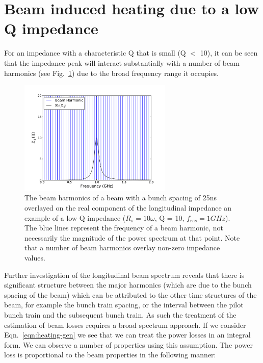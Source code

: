\documentclass{cernrep}
\begin{document}
\section{Beam induced heating due to a low Q impedance}

For an impedance with a characteristic Q that is small (Q $<$ 10), it can be seen that the impedance peak will interact substantially with a number of beam harmonics (see Fig.~\ref{fig:low_q_harmonics}) due to the broad frequency range it occupies.

\begin{figure}
\begin{center}
\includegraphics[width=0.65\textwidth]{figures/low_q_10_resonance_beam_harmonics.pdf}
\end{center}
\caption{The beam harmonics of a beam with a bunch spacing of 25ns overlayed on the real component of the longitudinal impedance an example of a low Q impedance ($R_{s}=10\omega$, Q = 10, $f_{res}=1GHz$). The blue lines represent the frequency of a beam harmonic, not necessarily the magnitude of the power spectrum at that point. Note that a number of beam harmonics overlay non-zero impedance values.}
\label{fig:low_q_harmonics}
\end{figure}

Further investigation of the longitudinal beam spectrum reveals that there is significant structure between the major harmonics (which are due to the bunch spacing of the beam) which can be attributed to the other time structures of the beam, for example the bunch train spacing, or the interval between the pilot bunch train and the subsequent bunch train. As such the treatment of the estimation of beam losses requires a broad spectrum approach. If we consider Eqn.~\ref{eqn:heating-gen} we see that we can treat the power losses in an integral form. We can observe a number of properties using this assumption. The power loss is proportional to the beam properties in the following manner:
\end{document}
